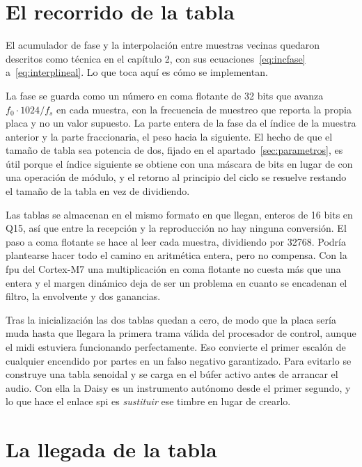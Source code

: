 \section{El recorrido de la tabla}
\label{sec:motor}

El acumulador de fase y la interpolación entre muestras vecinas quedaron
descritos como técnica en el capítulo 2, con sus
ecuaciones~\eqref{eq:incfase} a~\eqref{eq:interplineal}. Lo que toca aquí es
cómo se implementan.

La fase se guarda como un número en coma flotante de 32 bits que avanza
$f_0 \cdot 1024 / f_s$ en cada muestra, con la frecuencia de muestreo que
reporta la propia placa y no un valor supuesto. La parte entera de la fase da
el índice de la muestra anterior y la parte fraccionaria, el peso hacia la
siguiente. El hecho de que el tamaño de tabla sea potencia de
dos, fijado en el apartado~\ref{sec:parametros}, es útil porque el índice siguiente se
obtiene con una máscara de bits en lugar de con una operación de módulo, y el
retorno al principio del ciclo se resuelve restando el tamaño de la tabla en
vez de dividiendo.

Las tablas se almacenan en el mismo formato en que llegan, enteros de 16 bits
en Q15, así que entre la recepción y la reproducción no hay ninguna conversión.
El paso a coma flotante se hace al leer cada muestra, dividiendo por 32768.
Podría plantearse hacer todo el camino en aritmética entera, pero no compensa.
Con la \gls{fpu} del Cortex-M7 una multiplicación en coma flotante no cuesta más
que una entera y el margen dinámico deja de ser un problema en cuanto se
encadenan el filtro, la envolvente y dos ganancias.

Tras la inicialización las dos tablas quedan a cero, de modo que la placa sería 
muda hasta que llegara la primera trama válida del procesador de control, aunque 
el \gls{midi} estuviera funcionando perfectamente. Eso convierte el primer escalón 
de cualquier encendido por partes en un falso negativo garantizado. Para evitarlo se
construye una tabla senoidal y se carga en el búfer activo antes de arrancar el
audio. Con ella la Daisy es un instrumento autónomo desde el primer segundo, y
lo que hace el enlace \gls{spi} es \emph{sustituir} ese timbre en lugar de
crearlo.

\section{La llegada de la tabla}
\label{sec:receptor-spi}

